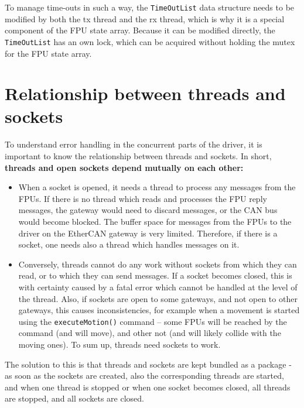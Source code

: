 \documentclass[fontsize=12,a4paper]{scrartcl}
\begin{document}
To manage time-outs in such a way, the \texttt{TimeOutList} data
structure needs to be modified by both the tx thread and the rx
thread, which is why it is a special component of the FPU state
array. Because it can be modified directly, the \texttt{TimeOutList}
has an own lock, which can be acquired without holding the mutex for
the FPU state array.

\section{Relationship between threads and sockets}

To understand error handling in the concurrent parts of the driver, it
is important to know the relationship between threads and sockets.
In short, \textbf{threads and open sockets depend mutually on each other:}

\begin{itemize}
\item 
  When a socket is opened, it needs a thread to process
  any messages from the FPUs. If there is no thread
  which reads and processes the FPU reply messages,
  the gateway would need to discard messages,
  or the CAN bus would become blocked. The buffer space
  for messages from the FPUs to the driver on the
  EtherCAN gateway is very limited. Therefore, if there
  is a socket, one needs also a thread which handles
  messages on it.
  
\item Conversely, threads cannot do any work without sockets from
  which they can read, or to which they can send messages.  If a
  socket becomes closed, this is with certainty caused by a fatal
  error which cannot be handled at the level of the thread.  Also, if
  sockets are open to some gateways, and not open to other gateways,
  this causes inconsistencies, for example when a movement is started
  using the \texttt{executeMotion()} command -- some FPUs will be
  reached by the command (and will move), and other not (and will
  likely collide with the moving ones). To sum up, threads need
  sockets to work.

  
\end{itemize}

The solution to this is that threads and sockets are kept bundled as a
package - as soon as the sockets are created, also the corresponding
threads are started, and when one thread is stopped or when one socket
becomes closed, all threads are stopped, and all sockets are closed.
\end{document}
